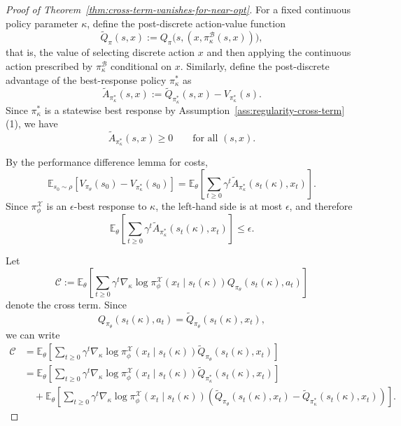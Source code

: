 \documentclass[10pt,a4paper]{amsart}
\begin{document}
\begin{proof}[Proof of Theorem~\ref{thm:cross-term-vanishes-for-near-opt}]

For a fixed continuous policy parameter $\kappa$, define the post-discrete
action-value function
\[
\tilde Q_{\pi}(s,x)
:=
Q_{\pi}\bigl(s,(x,\pi^{\mathcal B}_{\kappa}(s, x))\bigr),
\]
that is, the value of selecting discrete action $x$ and then applying the
continuous action prescribed by $\pi^{\mathcal B}_{\kappa}$ conditional on $x$. Similarly,
define the post-discrete advantage of the best-response policy $\pi^*_\kappa$ as
\[
\tilde A_{\pi^*_\kappa}(s,x)
:=
\tilde Q_{\pi^*_\kappa}(s,x)-V_{\pi^*_\kappa}(s).
\]
Since $\pi^*_\kappa$ is a statewise best response by
Assumption~\ref{ass:regularity-cross-term}(1), we have
\[
\tilde A_{\pi^*_\kappa}(s,x) \geq 0
\qquad \text{for all } (s,x).
\]

By the performance difference lemma for costs,
\[
\mathbb{E}_{s_0\sim \rho}
\!\left[
V_{\pi_\theta}(s_0)-V_{\pi^*_\kappa}(s_0)
\right]
=
\mathbb{E}_{\theta}\!\left[
\sum_{t\geq 0}\gamma^t
\tilde A_{\pi^*_\kappa}(s_t(\kappa),x_t)
\right].
\]
Since $\pi^{\mathcal X}_{\phi}$ is an $\epsilon$-best response to
$\kappa$, the left-hand side is at most $\epsilon$, and therefore
\begin{equation}
\label{eq:advantage-bound}
\mathbb{E}_{\theta}\!\left[
\sum_{t\geq 0}\gamma^t
\tilde A_{\pi^*_\kappa}(s_t(\kappa),x_t)
\right]
\leq \epsilon.
\end{equation}

Let
\[
\mathcal C
:=
\mathbb{E}_{\theta}\!\left[
\sum_{t\geq 0}
\gamma^t
\nabla_{\kappa}\log \pi^{\mathcal X}_{\phi}
\!\left(x_t\mid s_t(\kappa)\right)
Q_{\pi_\theta}(s_t(\kappa),a_t)
\right]
\]
denote the cross term. Since
\[
Q_{\pi_\theta}(s_t(\kappa),a_t)
=
\tilde Q_{\pi_\theta}(s_t(\kappa),x_t),
\]
we can write
\begin{align*}
\mathcal C
&=
\mathbb{E}_{\theta}\!\left[
\sum_{t\geq 0}\gamma^t
\nabla_{\kappa}\log \pi^{\mathcal X}_{\phi}
\!\left(x_t\mid s_t(\kappa)\right)
\tilde Q_{\pi_\theta}(s_t(\kappa),x_t)
\right] \\
&=
\mathbb{E}_{\theta}\!\left[
\sum_{t\geq 0}\gamma^t
\nabla_{\kappa}\log \pi^{\mathcal X}_{\phi}
\!\left(x_t\mid s_t(\kappa)\right)
\tilde Q_{\pi^*_\kappa}(s_t(\kappa),x_t)
\right] \\
&\quad+
\mathbb{E}_{\theta}\!\left[
\sum_{t\geq 0}\gamma^t
\nabla_{\kappa}\log \pi^{\mathcal X}_{\phi}
\!\left(x_t\mid s_t(\kappa)\right)
\left(
\tilde Q_{\pi_\theta}(s_t(\kappa),x_t)
-
\tilde Q_{\pi^*_\kappa}(s_t(\kappa),x_t)
\right)
\right].
\end{align*}


\end{proof}
\end{document}
